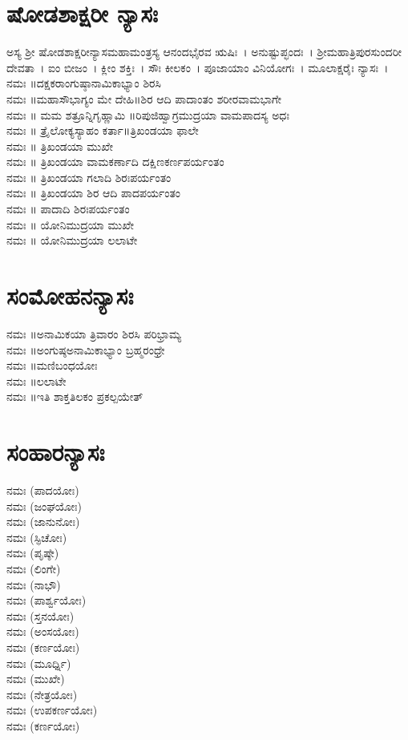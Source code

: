 \section{ಷೋಡಶಾಕ್ಷರೀ ನ್ಯಾಸಃ}
ಅಸ್ಯ ಶ್ರೀ ಷೋಡಶಾಕ್ಷರೀನ್ಯಾಸಮಹಾಮಂತ್ರಸ್ಯ ಆನಂದಭೈರವ ಋಷಿಃ~। ಅನುಷ್ಟುಪ್ಛಂದಃ~। ಶ್ರೀಮಹಾತ್ರಿಪುರಸುಂದರೀ ದೇವತಾ~। ಐಂ ಬೀಜಂ~। ಕ್ಲೀಂ ಶಕ್ತಿಃ~। ಸೌಃ ಕೀಲಕಂ~। ಪೂಜಾಯಾಂ ವಿನಿಯೋಗಃ~। ಮೂಲಾಕ್ಷರೈಃ ನ್ಯಾಸಃ~।\\
 ನಮಃ ॥ದಕ್ಷಕರಾಂಗುಷ್ಠಾನಾಮಿಕಾಭ್ಯಾಂ ಶಿರಸಿ\\
 ನಮಃ ॥ಮಹಾಸೌಭಾಗ್ಯಂ ಮೇ ದೇಹಿ॥ಶಿರ ಆದಿ ಪಾದಾಂತಂ ಶರೀರವಾಮಭಾಗೇ\\
 ನಮಃ ॥ ಮಮ ಶತ್ರೂನ್ನಿಗೃಹ್ಣಾಮಿ ॥ರಿಪುಜಿಹ್ವಾಗ್ರಮುದ್ರಯಾ ವಾಮಪಾದಸ್ಯ ಅಧಃ\\
 ನಮಃ ॥ ತ್ರೈಲೋಕ್ಯಸ್ಯಾಹಂ ಕರ್ತಾ॥ತ್ರಿಖಂಡಯಾ ಫಾಲೇ\\
 ನಮಃ ॥ ತ್ರಿಖಂಡಯಾ ಮುಖೇ\\
 ನಮಃ ॥ ತ್ರಿಖಂಡಯಾ ವಾಮಕರ್ಣಾದಿ ದಕ್ಷಿಣಕರ್ಣಪರ್ಯಂತಂ\\
 ನಮಃ ॥ ತ್ರಿಖಂಡಯಾ ಗಲಾದಿ ಶಿರಃಪರ್ಯಂತಂ\\
 ನಮಃ ॥ ತ್ರಿಖಂಡಯಾ ಶಿರ ಆದಿ ಪಾದಪರ್ಯಂತಂ\\
 ನಮಃ ॥ ಪಾದಾದಿ ಶಿರಃಪರ್ಯಂತಂ\\
 ನಮಃ ॥ ಯೋನಿಮುದ್ರಯಾ ಮುಖೇ\\
 ನಮಃ ॥ ಯೋನಿಮುದ್ರಯಾ ಲಲಾಟೇ
\section{ಸಂಮೋಹನನ್ಯಾಸಃ}
 ನಮಃ ॥ಅನಾಮಿಕಯಾ ತ್ರಿವಾರಂ ಶಿರಸಿ ಪರಿಭ್ರಾಮ್ಯ\\
 ನಮಃ ॥ಅಂಗುಷ್ಠಅನಾಮಿಕಾಭ್ಯಾಂ ಬ್ರಹ್ಮರಂಧ್ರೇ\\
 ನಮಃ ॥ಮಣಿಬಂಧಯೋಃ\\
 ನಮಃ ॥ಲಲಾಟೇ\\
 ನಮಃ ॥ಇತಿ ಶಾಕ್ತತಿಲಕಂ ಪ್ರಕಲ್ಪಯೇತ್
\section{ಸಂಹಾರನ್ಯಾಸಃ}
 ನಮಃ (ಪಾದಯೋಃ)\\
 ನಮಃ (ಜಂಘಯೋಃ)\\
 ನಮಃ (ಜಾನುನೋಃ)\\
 ನಮಃ (ಸ್ಫಿಚೋಃ)\\
 ನಮಃ (ಪೃಷ್ಠೇ)\\
 ನಮಃ (ಲಿಂಗೇ)\\
 ನಮಃ (ನಾಭೌ)\\
 ನಮಃ (ಪಾರ್ಶ್ವಯೋಃ)\\
 ನಮಃ (ಸ್ತನಯೋಃ)\\
 ನಮಃ (ಅಂಸಯೋಃ)\\
 ನಮಃ (ಕರ್ಣಯೋಃ)\\
 ನಮಃ (ಮೂರ್ಧ್ನಿ)\\
 ನಮಃ (ಮುಖೇ)\\
 ನಮಃ (ನೇತ್ರಯೋಃ)\\
 ನಮಃ (ಉಪಕರ್ಣಯೋಃ)\\
 ನಮಃ (ಕರ್ಣಯೋಃ)
